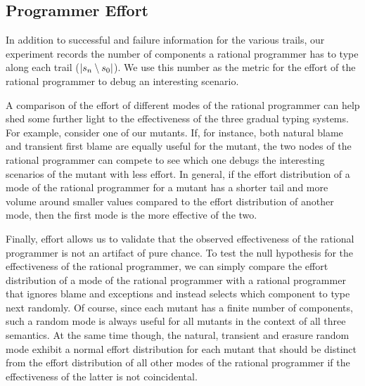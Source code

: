 \subsection{Programmer Effort}

In addition to successful and failure information for the various trails,  
our experiment  records the number of components a rational programmer 
has to type along each trail ($\lvert s_n \setminus s_0
\rvert$). We use this number as the metric for the effort 
of the rational programmer to debug an interesting scenario.  

A comparison of the effort of different modes of the rational programmer
can help shed some further light to the effectiveness of the
three gradual typing systems. For example, consider one of 
our mutants.  If, for instance, both natural blame and transient first
blame are equally useful for the mutant, the two nodes of the 
rational programmer can compete to see which one
debugs the interesting scenarios of the mutant with less effort. In
general, if the effort distribution of a mode of the rational programmer for a
mutant has a shorter tail and more
volume around smaller values compared to the effort distribution of another
mode, then the first mode is the more effective of the two.  

Finally, effort allows us to validate that the observed effectiveness 
of the rational programmer is not an artifact of pure chance.
To test the null hypothesis for the effectiveness of the rational
programmer, we can simply compare the effort distribution of a mode of the
rational programmer with a rational programmer that ignores blame and
exceptions and instead selects which component to type next randomly. 
Of course, since each mutant has a finite number of components, 
such a random mode is always useful for all mutants in the context of all
three semantics. At the same time though,
the natural, transient and erasure random mode exhibit a normal effort distribution for each mutant
that should be distinct from the effort distribution of all other modes of
the rational programmer if the effectiveness of the latter is not
coincidental.




